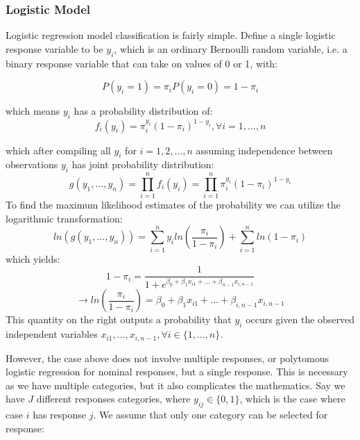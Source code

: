 \documentclass[titlepage, 12pt]{article}
\begin{document}
\subsubsection{Logistic Model}
\hspace{0.5 cm}Logistic regression model classification is fairly simple. Define a single logistic response variable to be $y_i$, which is an ordinary Bernoulli random variable, i.e. a binary response variable that can take on values of 0 or 1, with:

\begin{equation}
    P(y_i = 1) = \pi_i
    P(y_i = 0) = 1 - \pi_i
\end{equation}

which means $y_i$ has a probability distribution of:
\begin{equation}
    f_i(y_i) = \pi_i^{y_i}(1-\pi_i)^{1-y_i}, \forall i =1,...,n
\end{equation}

which after compiling all $y_i$ for $i = 1, 2, ..., n$ assuming independence between observations $y_i$ has joint probability distribution:
\begin{equation}
    g(y_1, ..., y_n) = \prod_{i=1}^{n} f_i(y_i)= \prod_{i=1}^{n}\pi_i^{y_i}(1-\pi_i)^{1-y_i}
\end{equation}
To find the maximum likelihood estimates of the probability we can utilize the logarithmic transformation:
\begin{equation}
    ln(g(y_1, ..., y_n)) =\sum_{i=1}^{n} y_i ln(\frac{\pi_i}{1-\pi_i}) + \sum_{i=1}^{n}ln(1-\pi_i)
\end{equation}
which yields:
\begin{equation}
    1-\pi_i = \frac{1}{1+e^{\beta_0 + \beta_1x_{i1} + ... + \beta_{n-1}x_{i,n-1}}} 
\end{equation}
\begin{equation}
    \rightarrow ln(\frac{\pi_i}{1-\pi_i})=\beta_0 + \beta_1x_{i1} + ...+\beta_{i,n-1}x_{i, n-1}
\end{equation}
This quantity on the right outputs a probability that $y_i$ occurs given the observed independent variables $x_{i1}, ..., x_{i, n-1}, \forall i \in \{1,..., n\}$.
\citep{alsm.2005}

However, the case above does not involve multiple responses, or polytomous logistic regression for nominal responses, but a single response. This is necessary as we have multiple categories, but it also complicates the mathematics. Say we have $J$ different responses categories, where $y_{ij} \in \{0,1\}$, which is the case where case $i$ has response $j$. We assume that only one category can be selected for response:
\end{document}
